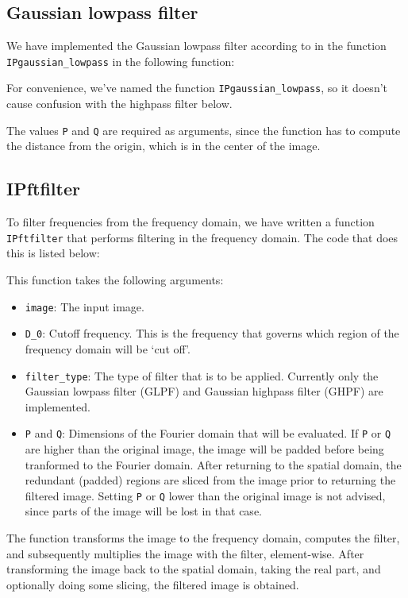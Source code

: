 \setcounter{subsection}{0}
\subsection{Gaussian lowpass filter}
We have implemented the Gaussian lowpass filter according to \cite[Equation~4.8-7]{gonzalez2002digital} in the function \texttt{IPgaussian\_lowpass} in the following function:

For convenience, we've named the function \texttt{IPgaussian\_lowpass}, so it doesn't cause confusion with the highpass filter below.

The values \texttt{P} and \texttt{Q} are required as arguments, since the function has to compute the distance from the origin, which is in the center of the image.

\subsection{IPftfilter}
To filter frequencies from the frequency domain, we have written a function \texttt{IPftfilter} that performs filtering in the frequency domain.
The code that does this is listed below:

This function takes the following arguments:
\begin{itemize}
	\item \texttt{image}: The input image.
	\item \texttt{D\_0}: Cutoff frequency. This is the frequency that governs which region of the frequency domain will be `cut off'.
	\item \texttt{filter\_type}: The type of filter that is to be applied. Currently only the Gaussian lowpass filter (GLPF) and Gaussian highpass filter (GHPF) are implemented.
	\item \texttt{P} and \texttt{Q}: Dimensions of the Fourier domain that will be evaluated.
		If \texttt{P} or \texttt{Q} are higher than the original image, the image will be padded before being tranformed to the Fourier domain.
		After returning to the spatial domain, the redundant (padded) regions are sliced from the image prior to returning the filtered image.
		Setting \texttt{P} or \texttt{Q} lower than the original image is not advised, since parts of the image will be lost in that case.
\end{itemize}

The function transforms the image to the frequency domain, computes the filter, and subsequently multiplies the image with the filter, element-wise.
After transforming the image back to the spatial domain, taking the real part, and optionally doing some slicing, the filtered image is obtained.


